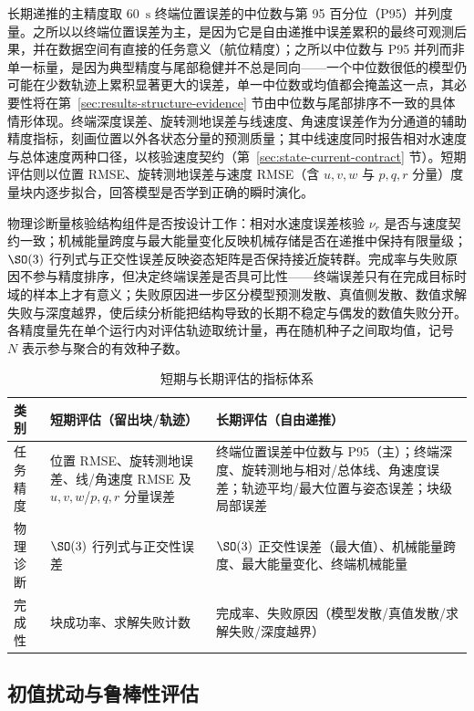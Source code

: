 长期递推的主精度取 60~\(\mathrm{s}\) 终端位置误差的中位数与第 95 百分位（P95）并列度量。之所以以终端位置误差为主，是因为它是自由递推中误差累积的最终可观测后果，并在数据空间有直接的任务意义（航位精度）；之所以中位数与 P95 并列而非单一标量，是因为典型精度与尾部稳健并不总是同向——一个中位数很低的模型仍可能在少数轨迹上累积显著更大的误差，单一中位数或均值都会掩盖这一点，其必要性将在第~\ref{sec:results-structure-evidence} 节由中位数与尾部排序不一致的具体情形体现。终端深度误差、旋转测地误差与线速度、角速度误差作为分通道的辅助精度指标，刻画位置以外各状态分量的预测质量；其中线速度同时报告相对水速度与总体速度两种口径，以核验速度契约（第~\ref{sec:state-current-contract} 节）。短期评估则以位置 RMSE、旋转测地误差与速度 RMSE（含 \(u,v,w\) 与 \(p,q,r\) 分量）度量块内逐步拟合，回答模型是否学到正确的瞬时演化。

物理诊断量核验结构组件是否按设计工作：相对水速度误差核验 \(\nu_r\) 是否与速度契约一致；机械能量跨度与最大能量变化反映机械存储是否在递推中保持有限量级；\(\SO(3)\) 行列式与正交性误差反映姿态矩阵是否保持接近旋转群。完成率与失败原因不参与精度排序，但决定终端误差是否具可比性——终端误差只有在完成目标时域的样本上才有意义；失败原因进一步区分模型预测发散、真值侧发散、数值求解失败与深度越界，使后续分析能把结构导致的长期不稳定与偶发的数值失败分开。各精度量先在单个运行内对评估轨迹取统计量，再在随机种子之间取均值，记号 \(N\) 表示参与聚合的有效种子数。

\begin{table}[htbp]
  \centering
  \caption{短期与长期评估的指标体系}
  \label{tab:metrics}
  \begin{tabularx}{\textwidth}{>{\raggedright\arraybackslash}p{}>{\raggedright\arraybackslash}X>{\raggedright\arraybackslash}X}
    \toprule
    类别 & 短期评估（留出块/轨迹） & 长期评估（自由递推） \\
    \midrule
    任务精度 & 位置 RMSE、旋转测地误差、线/角速度 RMSE 及 \(u,v,w\)/\(p,q,r\) 分量误差 & 终端位置误差中位数与 P95（主）；终端深度、旋转测地与相对/总体线、角速度误差；轨迹平均/最大位置与姿态误差；块级局部误差 \\
    物理诊断 & \(\SO(3)\) 行列式与正交性误差 & \(\SO(3)\) 正交性误差（最大值）、机械能量跨度、最大能量变化、终端机械能量 \\
    完成性 & 块成功率、求解失败计数 & 完成率、失败原因（模型发散/真值发散/求解失败/深度越界） \\
    \bottomrule
  \end{tabularx}
\end{table}

\subsection{初值扰动与鲁棒性评估}
\label{subsec:ic-perturbation}

